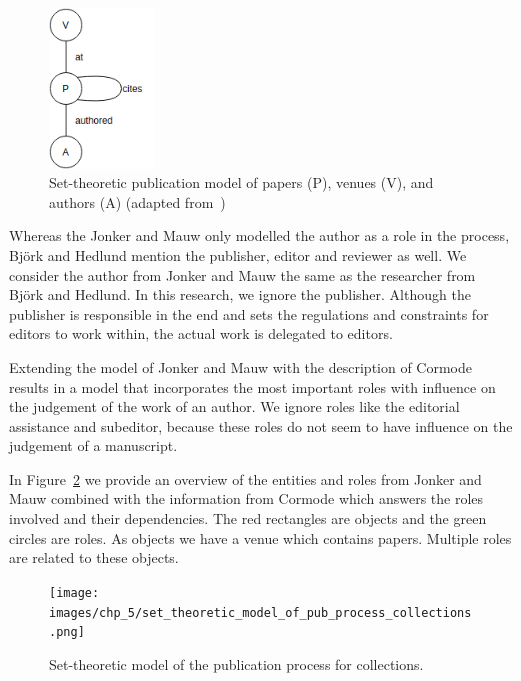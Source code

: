 \documentclass{ou-report}
\begin{document}
\begin{figure}
    \centering
    \vspace{-15pt}
    \includegraphics[width=0.25\textwidth]{images/jm2017_undiced_pub_view.drawio.png}
    \vspace{-13pt}
    \caption{Set-theoretic publication model of papers (P), venues (V), and 
authors (A) (adapted from~\cite{JM2017})}
    \label{fig:jm2017_induced_pub_model}
    \vspace{-16pt}
\end{figure}




Whereas the Jonker and Mauw only modelled the author as a role in the process, 
Bj\"ork and Hedlund mention the publisher, editor and reviewer as well. 
We consider the author from Jonker and Mauw the same as the researcher from 
Bj\"ork and Hedlund. In this research, we ignore the publisher. Although the 
publisher is responsible in the end and sets the regulations and constraints for
editors to work within, the actual work is delegated to editors.

Extending the model of Jonker and Mauw with the description of Cormode
\cite{C2013} results
in a model that incorporates the most important roles with influence on the 
judgement of the work of an author. We 
ignore roles like the editorial assistance and subeditor, because these roles do
not seem to have influence on the judgement of a manuscript. 

In Figure~\ref{fig:structure_journal} we provide an overview of the entities and
roles from Jonker and Mauw combined with the information from Cormode which 
answers the roles involved and their dependencies.
The red rectangles are objects and the green circles are roles.
As objects we have a venue which contains papers. Multiple roles are related to
these objects.

\begin{figure}[t]
\centering
\texttt{[image: images/chp\_5/set\_theoretic\_model\_of\_pub\_process\_collections.png]}
\caption{Set-theoretic model of the publication process for collections.}
\label{fig:structure_journal}
\end{figure}
\end{document}

